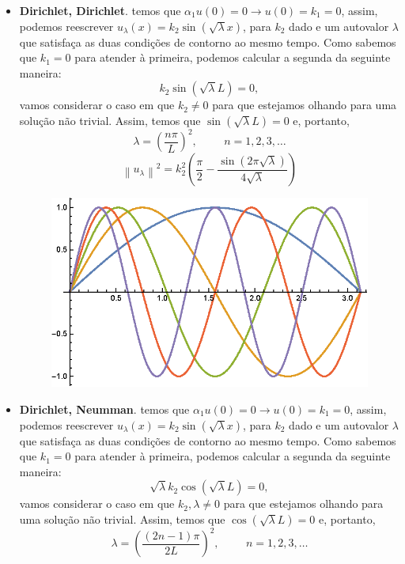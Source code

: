 \documentclass[10pt,a4paper]{article}
\newcommand{\prt}[1]{\left(#1\right)}
\newcommand{\norm}[1]{\left\lVert#1\right\rVert}
\begin{document}
\begin{itemize}
	\item \textbf{Dirichlet, Dirichlet}. temos que $\alpha_1u(0)=0\rightarrow u(0)=k_1=0$, assim, podemos reescrever $u_\lambda(x)=k_2\sin{\prt{\sqrt{\lambda}x}}$, para $k_2$ dado e um autovalor $\lambda$ que satisfaça as duas condições de contorno ao mesmo tempo. Como sabemos que $k_1=0$ para atender à primeira, podemos calcular a segunda da seguinte maneira: \[k_2\sin{\prt{\sqrt{\lambda}L}} = 0,\]
vamos considerar o caso em que $k_2\neq 0$ para que estejamos olhando para uma solução não trivial. Assim, temos que $\sin{\prt{\sqrt{\lambda}L}} = 0$ e, portanto, \[\lambda = \prt{\frac{n\pi}{L}}^2, \hspace{1cm}n=1,2,3,\dots\]
	\[\norm{u_\lambda}^2 = k_2^2 \left(\frac{\pi }{2}-\frac{\sin \left(2 \pi  \sqrt{\lambda }\right)}{4 \sqrt{\lambda }}\right)\]
	
	\begin{figure}[h!]
    \centering
      \includegraphics[scale=1]{figures/dd.eps}
	\end{figure}	
	
	\item \textbf{Dirichlet, Neumman}. temos que $\alpha_1u(0)=0\rightarrow u(0)=k_1=0$, assim, podemos reescrever $u_\lambda(x)=k_2\sin{\prt{\sqrt{\lambda}x}}$, para $k_2$ dado e um autovalor $\lambda$ que satisfaça as duas condições de contorno ao mesmo tempo. Como sabemos que $k_1=0$ para atender à primeira, podemos calcular a segunda da seguinte maneira: \[\sqrt{\lambda}k_2\cos{\prt{\sqrt{\lambda}L}} = 0,\]
vamos considerar o caso em que $k_2,\lambda\neq 0$ para que estejamos olhando para uma solução não trivial. Assim, temos que $\cos{\prt{\sqrt{\lambda}L}} = 0$ e, portanto, \[\lambda = \prt{\frac{(2n-1)\pi}{2L}}^2, \hspace{1cm}n=1,2,3,\dots\]


\end{itemize}
\end{document}
